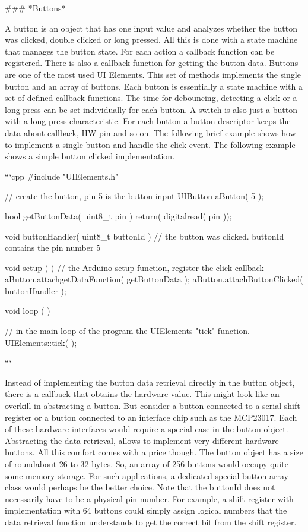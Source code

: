 ### *Buttons*

A button is an object that has one input value and analyzes whether the button was clicked, double clicked or long pressed. All this is done with a state machine that manages the button state. For each action a callback function can be registered. There is also a callback function for getting the button data. Buttons are one  of the most used UI Elements. This set of methods implements the single button and an array of buttons. Each button is essentially a state machine with a set of defined callback functions. The time for debouncing, detecting a click or a long press can be set individually for each button. A switch is also just a button with a long press characteristic. For each button a button descriptor keeps the data about callback, HW pin and so on. The following brief example shows how to implement a single button and handle the click event. The following example shows a simple button clicked implementation.


```cpp
#include "UIElements.h"

// create the button, pin 5 is the button input
UIButton aButton( 5 );

bool getButtonData( uint8_t pin ) {
	return( digitalread( pin ));
}

void buttonHandler( uint8_t buttonId ) {
	// the button was clicked. buttonId contains the pin number 5
}

void setup ( ) {
	// the Arduino setup function, register the click callback
	aButton.attachgetDataFunction( getButtonData );
  aButton.attachButtonClicked( buttonHandler );
}

void loop ( ) {

    // in the main loop of the program the UIElements "tick" function.
	UIElements::tick( );
}
```

Instead of implementing the button data retrieval directly in the button object, there is a callback that obtains the hardware value. This might look like an overkill in abstracting a button. But consider a button connected to a serial shift register or a button connected to an interface chip such as the MCP23017. Each of these hardware interfaces would require a special case in the button object. Abstracting the data retrieval, allows to implement very different hardware buttons. All this comfort comes with a price though. The button object has a size of roundabout 26 to 32 bytes. So, an array of 256 buttons would occupy quite some memory storage. For such applications, a dedicated special button array class would perhaps be the better choice. Note that the buttonId does not necessarily have to be a physical pin number. For example, a shift register with implementation with 64 buttons could simply assign logical numbers that the data retrieval function understands to get the correct bit from the shift register.


